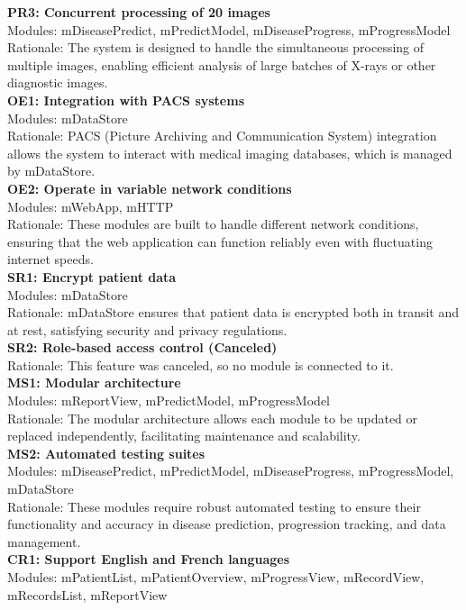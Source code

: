 \documentclass[12pt, titlepage]{article}
\begin{document}
\textbf{PR3: Concurrent processing of 20 images} \\
Modules: mDiseasePredict, mPredictModel, mDiseaseProgress, mProgressModel \\
Rationale: The system is designed to handle the simultaneous processing of multiple images, enabling efficient analysis of large batches of X-rays or other diagnostic images. \\
\textbf{OE1: Integration with PACS systems} \\
Modules: mDataStore \\
Rationale: PACS (Picture Archiving and Communication System) integration allows the system to interact with medical imaging databases, which is managed by mDataStore. \\
\textbf{OE2: Operate in variable network conditions} \\
Modules: mWebApp, mHTTP \\
Rationale: These modules are built to handle different network conditions, ensuring that the web application can function reliably even with fluctuating internet speeds. \\
\textbf{SR1: Encrypt patient data} \\
Modules: mDataStore \\
Rationale: mDataStore ensures that patient data is encrypted both in transit and at rest, satisfying security and privacy regulations. \\
\textbf{SR2: Role-based access control (Canceled)} \\
Rationale: This feature was canceled, so no module is connected to it. \\
\textbf{MS1: Modular architecture} \\
Modules: mReportView, mPredictModel, mProgressModel \\
Rationale: The modular architecture allows each module to be updated or replaced independently, facilitating maintenance and scalability. \\
\textbf{MS2: Automated testing suites} \\
Modules: mDiseasePredict, mPredictModel, mDiseaseProgress, mProgressModel, mDataStore \\
Rationale: These modules require robust automated testing to ensure their functionality and accuracy in disease prediction, progression tracking, and data management. \\
\textbf{CR1: Support English and French languages} \\
Modules: mPatientList, mPatientOverview, mProgressView, mRecordView, mRecordsList, mReportView \\
\end{document}
